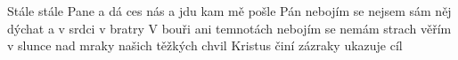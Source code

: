 \begin{TEXT}{Stále stále}
\REFREN     {}    Pane \NL
{}  a   \NL
{} dá  ces nás  \NL
{}  a    
\SLOKA {}jdu kam mě pošle Pán nebojím se nejsem sám \NL
{} něj dýchat  a  \NL
{} v srdci   v bratry  \NL
{}   
\SLOKA V bouři ani temnotách nebojím se nemám strach \NL
věřím v slunce nad mraky našich těžkých chvil \NL
Kristus činí zázraky ukazuje cíl 
\end{TEXT}
